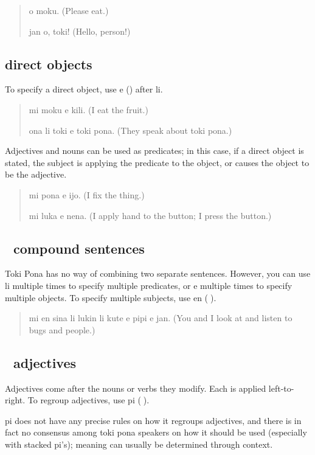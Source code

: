 \documentclass[statementpaper,oneside,article,14pt]{memoir}
\begin{document}
\begin{quote}
  o moku. (Please eat.)

  jan o, toki! (Hello, person!)
\end{quote}

\subsection{{} direct objects}

\noindent To specify a direct object, use e ({}) after li.

\begin{quote}
  mi moku e kili. (I eat the fruit.)

  ona li toki e toki pona. (They speak about toki pona.)
\end{quote}

\noindent Adjectives and nouns can be used as predicates; in this case, if a direct object is stated,
the subject is applying the predicate to the object, or causes the object to be 
the adjective.

\begin{quote}
  mi pona e ijo. (I fix the thing.)

  mi luka e nena. (I apply hand to the button; I press the button.)
\end{quote}

\subsection{{\sitpon󱤊} compound sentences}

\noindent Toki Pona has no way of combining two separate sentences. However, you can use li multiple times 
to specify multiple predicates, or e multiple times to specify multiple objects. To specify 
multiple subjects, use en ({\sitpon󱤊}).

\begin{quote}
  mi en sina li lukin li kute e pipi e jan. (You and I look at and listen to bugs and people.)
\end{quote}


\subsection{{\sitpon󱥍} adjectives}

\noindent Adjectives come after the nouns or verbs they modify. Each is applied left-to-right. To regroup adjectives, use pi ({\sitpon󱥍}).

pi does not have any precise rules on how it regroups adjectives, and there is
in fact no consensus among toki pona speakers on how it should be used (especially 
with stacked pi's); meaning can usually be determined through context.
\end{document}
